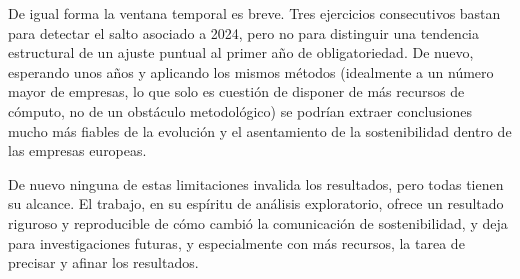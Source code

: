 De igual forma la ventana temporal es breve. Tres ejercicios consecutivos bastan
para detectar el salto asociado a 2024, pero no para distinguir una tendencia estructural de un
ajuste puntual al primer año de obligatoriedad. De nuevo, esperando unos años y aplicando los
mismos métodos (idealmente a un número mayor de empresas, lo que solo es cuestión de disponer de
más recursos de cómputo, no de un obstáculo metodológico) se podrían extraer conclusiones mucho
más fiables de la evolución y el asentamiento de la sostenibilidad dentro de las empresas
europeas.

De nuevo ninguna de estas limitaciones invalida los resultados, pero todas tienen su alcance. El trabajo, en su espíritu de análisis exploratorio,
ofrece un resultado riguroso y reproducible de cómo cambió la comunicación de sostenibilidad,
y deja para investigaciones futuras, y especialmente con más recursos, la tarea de precisar y afinar los resultados.
